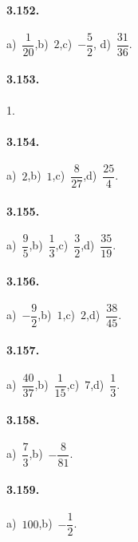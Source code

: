 \begin{multicols}{2}
\paragraph{3.152.}
a)~$\dfrac{1}{20}$,\quad b)~$2$,\quad c)~$-\dfrac{5}{2}$,\quad %
d)~$\dfrac{31}{36}$.

\paragraph{3.153.}1.

\paragraph{3.154.}
a)~$2$,\quad b)~$1$,\quad c)~$\dfrac{8}{27}$,\quad d)~$\dfrac{25}{4}$.

\paragraph{3.155.}
a)~$\dfrac{9}{5}$,\quad b)~$\dfrac{1}{3}$,\quad c)~$\dfrac{3}{2}$,\quad d)~$\dfrac{35}{19}$.

\paragraph{3.156.}
a)~$-\dfrac{9}{2}$,\quad b)~$1$,\quad c)~$2$,\quad d)~$\dfrac{38}{45}$.

\paragraph{3.157.}
a)~$\dfrac{40}{37}$,\quad b)~$\dfrac{1}{15}$,\quad c)~$7$,\quad d)~$\dfrac{1}{3}$.

\paragraph{3.158.}
a)~$\dfrac{7}{3}$,\quad b)~$-\dfrac{8}{81}$.

\paragraph{3.159.}
a)~$100$,\quad b)~$-\dfrac{1}{2}$.
\end{multicols}

